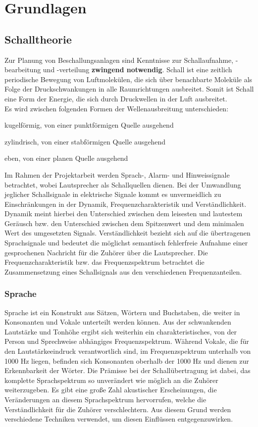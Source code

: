 \chapter{Grundlagen}
\label{cha:Grundlagen}

\section{Schalltheorie} 
\label{sec:Schalltheorie}
Zur Planung von Beschallungsanlagen sind Kenntnisse zur Schallaufnahme, -bearbeitung und -verteilung \textbf{zwingend notwendig}. Schall ist eine zeitlich periodische Bewegung von Luftmolekülen, die sich über benachbarte Moleküle als Folge der Druckschwankungen in alle Raumrichtungen ausbreitet. Somit ist Schall eine Form der Energie, die sich durch Druckwellen in der Luft ausbreitet. \\
Es wird zwischen folgenden Formen der Wellenausbreitung unterschieden:
\begin{compactenum}
\item kugelförmig, von einer punktförmigen Quelle ausgehend
\item zylindrisch, von einer stabförmigen Quelle ausgehend 
\item eben, von einer planen Quelle ausgehend
\end{compactenum}
Im Rahmen der Projektarbeit werden Sprach-, Alarm- und Hinweissignale betrachtet, wobei Lautsprecher als Schallquellen dienen. Bei der Umwandlung jeglicher Schallsignale in elektrische Signale kommt es unvermeidlich zu Einschränkungen in der Dynamik, Frequenzcharakteristik und Verständlichkeit.
Dynamik meint hierbei den Unterschied zwischen dem leisesten und lautestem Geräusch bzw. den Unterschied zwischen dem Spitzenwert und dem minimalen Wert des umgesetzten Signals. Verständlichkeit bezieht sich auf die übertragenen Sprachsignale und bedeutet die möglichst semantisch fehlerfreie Aufnahme einer gesprochenen Nachricht für die Zuhörer über die Lautsprecher. Die Frequenzcharakteristik bzw. das Frequenzspektrum betrachtet die Zusammensetzung eines Schallsignals aus den verschiedenen Frequenzanteilen.

\subsection{Sprache} 
\label{sub:Sprache} 
Sprache ist ein Konstrukt aus Sätzen, Wörtern und Buchstaben, die weiter in Konsonanten und Vokale unterteilt werden können. Aus der schwankenden Lautstärke und Tonhöhe ergibt sich weiterhin ein charakteristisches, von der Person und Sprechweise abhängiges Frequenzspektrum. Während Vokale, die für den Lautstärkeeindruck verantwortlich sind, im Frequenzspektrum unterhalb von 1000 Hz liegen, befinden sich Konsonanten oberhalb der 1000 Hz und dienen zur Erkennbarkeit der Wörter. 
Die Prämisse bei der Schallübertragung ist dabei, das komplette Sprachspektrum so unverändert wie möglich an die Zuhörer weiterzugeben. Es gibt eine große Zahl akustischer Erscheinungen, die Veränderungen an diesem Sprachspektrum hervorrufen, welche die Verständlichkeit für die Zuhörer verschlechtern. Aus diesem Grund werden verschiedene Techniken verwendet, um diesen Einflüssen entgegenzuwirken.

